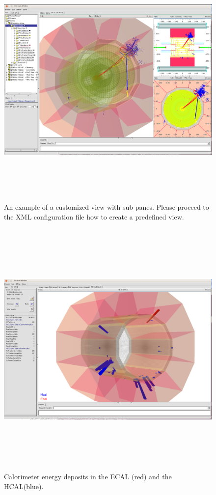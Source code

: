 \documentclass[10pt,a4paper]{article}
\begin{document}
\begin{figure}[h]
  \begin{center}
    \includegraphics[height=130mm] {DDEve_5}
    \caption{An example of a customized view with sub-panes. Please proceed 
               to the XML configuration file how to create a predefined view.}
    \label{fig:DDEve_5}
  \end{center}
\end{figure}

\newpage
\noindent
\begin{figure}[h]
  \begin{center}
    \includegraphics[height=130mm] {DDEve_7}
    \caption{Calorimeter energy deposits in the ECAL (red) and the HCAL(blue).}
    \label{fig:DDEve_5}
  \end{center}
\end{figure}
\end{document}
